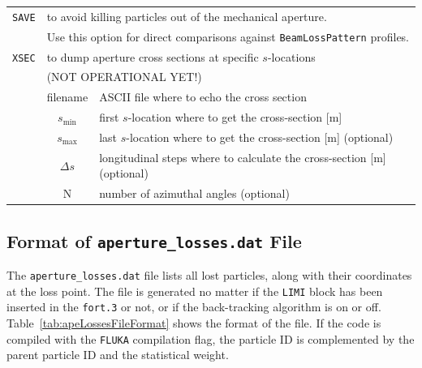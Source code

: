 \begin{center}
\begin{longtable}{|c|c|l|}
    \texttt{SAVE}  & \multicolumn{2}{l|}{to avoid killing particles out of the mechanical aperture.} \\*
                   & \multicolumn{2}{l|}{Use this option for direct comparisons against \texttt{BeamLossPattern} profiles.} \\*
    \hline

    \texttt{XSEC}  & \multicolumn{2}{l|}{to dump aperture cross sections at specific $s$-locations} \\*
                   & \multicolumn{2}{l|}{(NOT OPERATIONAL YET!)} \\*
    \cline{2-3}
                   & filename & ASCII file where to echo the cross section \\*
                   & $s_{\textrm{min}}$ & first $s$-location where to get the cross-section [m] \\*
                   & $s_{\textrm{max}}$ & last $s$-location where to get the cross-section [m] (optional) \\*
                   & $\Delta s$ & longitudinal steps where to calculate the cross-section [m] (optional) \\*
                   & N & number of azimuthal angles (optional) \\*
    \hline

\end{longtable}
\end{center}

\subsection{Format of \texttt{aperture\_losses.dat} File}\label{ApeLim:ApeLossesFileFormat}
The \texttt{aperture\_losses.dat} file lists all lost particles, along with their coordinates at the loss point.
The file is generated no matter if the \texttt{LIMI} block has been inserted in the \texttt{fort.3} or not, or if the back-tracking algorithm is on or off.
Table~\ref{tab:apeLossesFileFormat} shows the format of the file.
If the code is compiled with the \texttt{FLUKA} compilation flag, the particle ID is complemented by the parent particle ID and the statistical weight.

